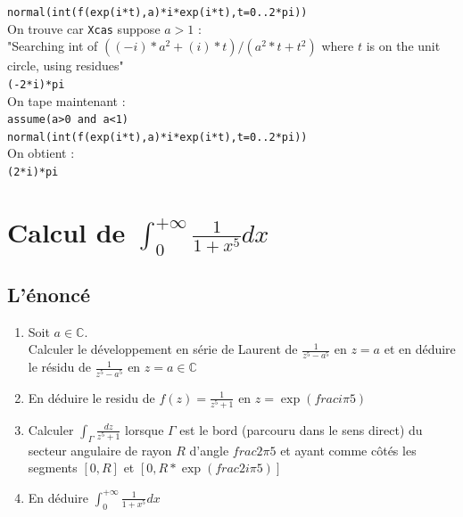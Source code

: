 \documentclass[a4paper,11pt]{book}
\newcommand{\C}{{\mathbb{C}}}
\begin{document}
{\tt normal(int(f(exp(i*t),a)*i*exp(i*t),t=0..2*pi))}\\
On trouve car {\tt Xcas} suppose $a>1$ :\\
"Searching int of $((-i)*a^2+(i)*t)/(a^2*t+t^2)$ where $t$ is on the unit circle, using residues"\\
{\tt (-2*i)*pi}\\
On tape maintenant :\\
{\tt assume(a>0 and a<1)}\\
{\tt normal(int(f(exp(i*t),a)*i*exp(i*t),t=0..2*pi))}\\
On obtient :\\
{\tt (2*i)*pi}\\

\section{Calcul de $\int_0^{+\infty}\frac{1}{1+x^5}dx$}
\subsection{L'\'enonc\'e}
\begin{enumerate}
\item Soit $a\in \C$.\\ 
Calculer le d\'eveloppement en s\'erie de Laurent de $\frac{1}{z^5-a^5}$ en $z=a$ et en d\'eduire le r\'esidu de $\frac{1}{z^5-a^5}$ en $z=a\in \C$
\item En d\'eduire le residu de  $f(z)=\frac{1}{z^5+1}$ en 
$z=\exp(frac{i\pi}{5})$
\item Calculer $\int_\Gamma\frac{dz}{z^5+1}$ lorsque $\Gamma$ est le bord
(parcouru dans le sens direct) du secteur angulaire de rayon $R$ d'angle 
$frac{2\pi}{5}$ et ayant comme c\^ot\'es les segments $[0,R]$ et 
$[0,R*\exp(frac{2i\pi}{5})]$
\item En d\'eduire $\int_0^{+\infty}\frac{1}{1+x^5}dx$
\end{enumerate}
\end{document}
